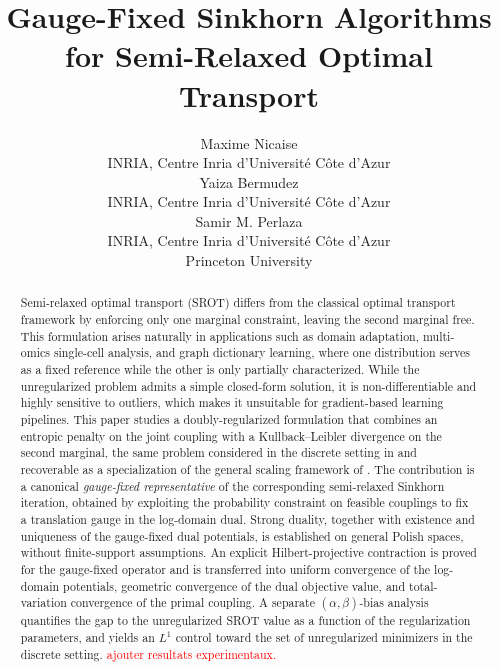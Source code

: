 \documentclass{article}
\title{Gauge-Fixed Sinkhorn Algorithms for Semi-Relaxed Optimal Transport}
\author{%
  Maxime Nicaise \\
  INRIA, Centre Inria d'Université Côte d'Azur \\
  \And
  Yaiza Bermudez \\
  INRIA, Centre Inria d'Université Côte d'Azur \\
  \AND
  Samir M. Perlaza \\
  INRIA, Centre Inria d'Université Côte d'Azur \\
  Princeton University
}
\begin{document}
\maketitle

\begin{abstract}
Semi-relaxed optimal transport (SROT) differs from the classical optimal transport framework by enforcing only one marginal constraint, leaving the second marginal free. This formulation arises naturally in applications such as domain adaptation, multi-omics single-cell analysis, and graph dictionary learning, where one distribution serves as a fixed reference while the other is only partially characterized. While the unregularized problem admits a simple closed-form solution, it is non-differentiable and highly sensitive to outliers, which makes it unsuitable for gradient-based learning pipelines. This paper studies a doubly-regularized formulation that combines an entropic penalty on the joint coupling with a Kullback--Leibler divergence on the second marginal, the same problem considered in the discrete setting in \cite{le2021robust, fukunaga2022convergence} and recoverable as a specialization of the general scaling framework of \cite{chizat2018scaling}. The contribution is a canonical \emph{gauge-fixed representative} of the corresponding semi-relaxed Sinkhorn iteration, obtained by exploiting the probability constraint on feasible couplings to fix a translation gauge in the log-domain dual. Strong duality, together with existence and uniqueness of the gauge-fixed dual potentials, is established on general Polish spaces, without finite-support assumptions. An explicit Hilbert-projective contraction is proved for the gauge-fixed operator and is transferred into uniform convergence of the log-domain potentials, geometric convergence of the dual objective value, and total-variation convergence of the primal coupling. A separate $(\alpha,\beta)$-bias analysis quantifies the gap to the unregularized SROT value as a function of the regularization parameters, and yields an $L^1$ control toward the set of unregularized minimizers in the discrete setting. \textcolor{red}{ajouter resultats experimentaux.}
\end{abstract}
\end{document}
